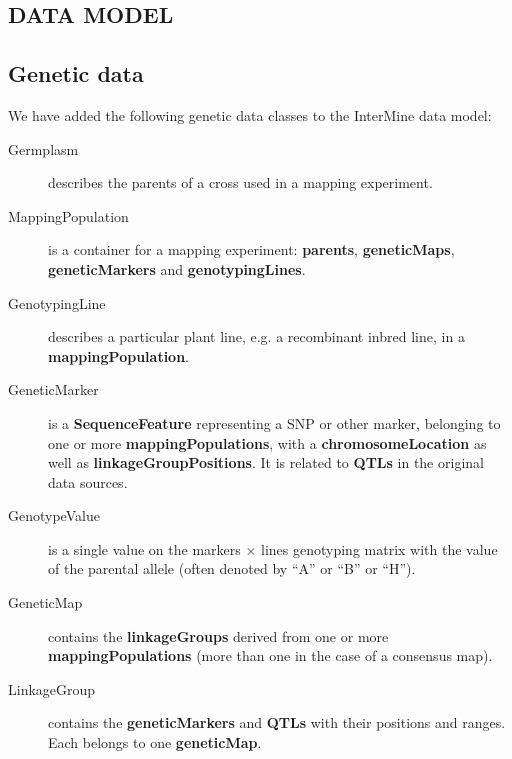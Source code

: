 \documentclass[]{pagposter}
\begin{document}
\begin{multicols*}{3}
  \color{Black}


  \section*{DATA MODEL}

  \subsection*{Genetic data}

  We have added the following genetic data classes to the InterMine data model:

  \begin{description}

    \item[Germplasm] describes the parents of a cross used in a mapping experiment.

    \item[MappingPopulation] is a container for a mapping experiment: \textbf{parents}, \textbf{geneticMaps}, \textbf{geneticMarkers} and \textbf{genotypingLines}.
      
    \item[GenotypingLine] describes a particular plant line, e.g. a recombinant inbred line, in a \textbf{mappingPopulation}.
      
    \item[GeneticMarker] is a \textbf{SequenceFeature} representing a SNP or other marker, belonging to one or more \textbf{mappingPopulations},
      with a \textbf{chromosomeLocation} as well as \textbf{linkageGroupPositions}.
      It is related to \textbf{QTLs} in the original data sources.
      
    \item[GenotypeValue] is a single value on the markers $\times$ lines genotyping matrix with the value of the parental allele (often denoted by ``A'' or ``B'' or ``H'').
      
    \item[GeneticMap] contains the \textbf{linkageGroups} derived from one or more \textbf{mappingPopulations} (more than one in the case of a consensus map).
      
    \item[LinkageGroup] contains the \textbf{geneticMarkers} and \textbf{QTLs} with their positions and ranges. Each belongs to one \textbf{geneticMap}.
      

\end{description}
\end{multicols*}
\end{document}
